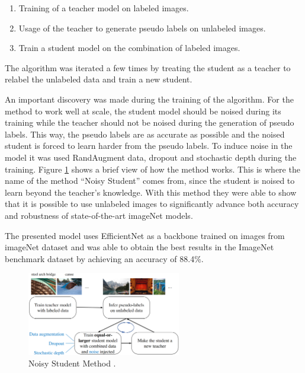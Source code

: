 \begin{enumerate}
    \item Training of a teacher model on labeled images.
    \item Usage of the teacher to generate pseudo labels on unlabeled images.
    \item Train a student model on the combination of labeled images.
\end{enumerate}

\par The algorithm was iterated a few times by treating the student as a teacher to relabel the unlabeled data and train a new student.

\par An important discovery was made during the training of the algorithm. For the method to work well at scale, the student model should be noised during its training while the teacher should not be noised during the generation of pseudo labels. This way, the pseudo labels are as accurate as possible and the noised student is forced to learn harder from the pseudo labels. To induce noise in the model it was used RandAugment data, dropout and stochastic depth during the training. Figure \ref{fig:noisestudent} shows a brief view of how the method works. This is where the name of the method \enquote{Noisy Student} comes from, since the student is noised to learn beyond the teacher's knowledge. With this method they were able to show that it is possible to use unlabeled images to significantly advance both accuracy and robustness of state-of-the-art imageNet models.
\par The presented model uses EfficientNet as a backbone trained on images from imageNet dataset and was able to obtain the best results in the ImageNet benchmark dataset by achieving an accuracy of 88.4\%.



\begin{figure}[H]
    \centering
    \captionsetup{justification=centering}
    \includegraphics[width=0.6\textwidth]{Sections/2StateOfTheArt/2_images/noisy_student.png}
    \caption[Noisy Student Method]{Noisy Student Method \cite{Xie2019}.} 
    \label{fig:noisestudent}
\end{figure}

